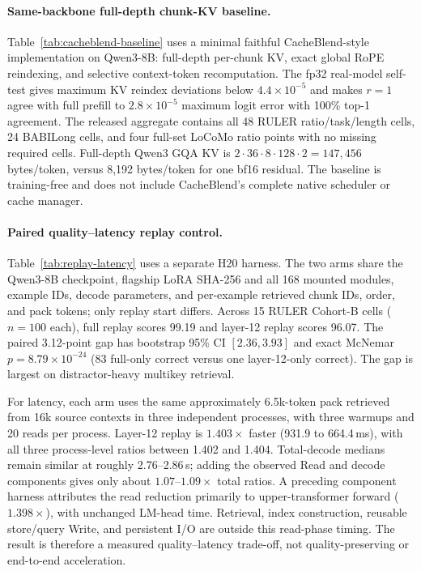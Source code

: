 

\paragraph{Same-backbone full-depth chunk-KV baseline.}
Table~\ref{tab:cacheblend-baseline} uses a minimal faithful CacheBlend-style
implementation on Qwen3-8B: full-depth per-chunk KV, exact global RoPE
reindexing, and selective context-token recomputation. The fp32 real-model
self-test gives maximum KV reindex deviations below
$4.4\!\times\!10^{-5}$ and makes $r{=}1$ agree with full prefill to
$2.8\!\times\!10^{-5}$ maximum logit error with 100\% top-1 agreement. The
released aggregate contains all 48 RULER ratio/task/length cells, 24 BABILong
cells, and four full-set LoCoMo ratio points with no missing required cells.
Full-depth Qwen3 GQA KV is
$2\cdot36\cdot8\cdot128\cdot2=147{,}456$ bytes/token, versus 8,192 bytes/token
for one bf16 residual. The baseline is training-free and does not include
CacheBlend's complete native scheduler or cache manager.

\paragraph{Paired quality--latency replay control.}
Table~\ref{tab:replay-latency} uses a separate H20 harness. The two arms share
the Qwen3-8B checkpoint, flagship LoRA SHA-256 and all 168 mounted modules,
example IDs, decode parameters, and per-example retrieved chunk IDs, order, and
pack tokens; only replay start differs. Across 15 RULER Cohort-B cells
($n{=}100$ each), full replay scores 99.19 and layer-12 replay scores 96.07.
The paired 3.12-point gap has bootstrap 95\% CI $[2.36,3.93]$ and exact McNemar
$p{=}8.79\!\times\!10^{-24}$ (83 full-only correct versus one layer-12-only
correct). The gap is largest on distractor-heavy multikey retrieval.

For latency, each arm uses the same approximately 6.5k-token pack retrieved from
16k source contexts in three independent
processes, with three warmups and 20 reads per process. Layer-12 replay is
$1.403\times$ faster (931.9 to 664.4\,ms), with all three process-level ratios
between 1.402 and 1.404. Total-decode medians remain similar at roughly
2.76--2.86\,s; adding the observed Read and decode components gives only about
$1.07$--$1.09\times$ total ratios. A preceding component harness attributes the read reduction
primarily to upper-transformer forward ($1.398\times$), with unchanged LM-head
time. Retrieval, index construction, reusable store/query Write, and persistent
I/O are outside this read-phase timing. The result is therefore a measured
quality--latency trade-off, not quality-preserving or end-to-end acceleration.

